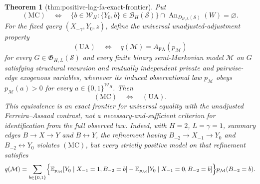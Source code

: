 \documentclass{article}
\newtheorem{theorem}{Theorem}
\begin{document}
\begin{theorem}[thm:positive-lag-fa-exact-frontier]\label{thm:positive-lag-fa-exact-frontier}
Put
\[
\mathrm{(MC)}\quad\Longleftrightarrow\quad
\bigl\{b\in\mathcal W_H:\{Y_0,b\}\in\mathcal B_H(\mathcal S)\bigr\}
\cap\operatorname{An}_{D_{H,L}(\mathcal S)}(W)=\varnothing.
\]
For the fixed query \((X_{-\gamma},Y_0,z)\), define the universal unadjusted-adjustment property
\[
\mathrm{(UA)}\quad\Longleftrightarrow\quad
q(\mathcal M)=A_{\mathrm{FA}}(p_{\mathcal M})
\]
for every \(G\in\mathfrak G_{H,L}(\mathcal S)\) and every finite binary semi-Markovian model \(\mathcal M\) on \(G\) satisfying structural recursion and mutually independent private and pairwise-edge exogenous variables, whenever its induced observational law \(p_{\mathcal M}\) obeys \(p_{\mathcal M}(a)>0\) for every \(a\in\{0,1\}^{\mathcal W_H}\).  Then
\[
\mathrm{(MC)}\quad\Longleftrightarrow\quad\mathrm{(UA)}.
\]
This equivalence is an exact frontier for universal equality with the unadjusted Ferreira--Assaad contrast, not a necessary-and-sufficient criterion for identification from the full observed law.  Indeed, with \(H=2\), \(L=\gamma=1\), summary edges \(B\to X\to Y\) and \(B\leftrightarrow Y\), the refinement having \(B_{-2}\to X_{-1}\to Y_0\) and \(B_{-2}\leftrightarrow Y_0\) violates \(\mathrm{(MC)}\), but every strictly positive model on that refinement satisfies
\[
q(\mathcal M)=
\sum_{b\in\{0,1\}}
\Bigl\{
\mathbb E_{p_{\mathcal M}}[Y_0\mid X_{-1}=1,B_{-2}=b]
-
\mathbb E_{p_{\mathcal M}}[Y_0\mid X_{-1}=0,B_{-2}=b]
\Bigr\}p_{\mathcal M}(B_{-2}=b).
\]
\end{theorem}
\end{document}
